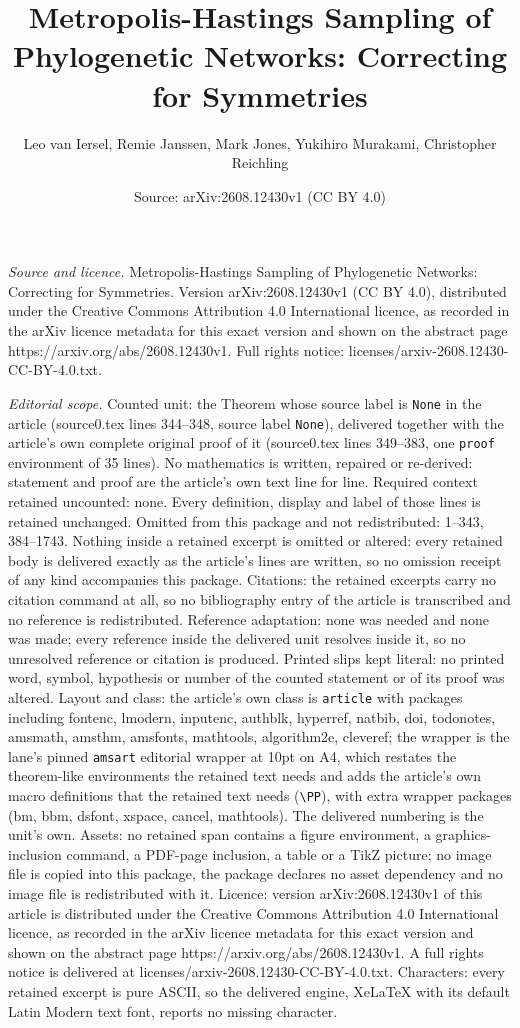 \documentclass[10pt,a4paper]{amsart}
\title[Metropolis-Hastings Sampling of Phylogenetic Networks: Corre]{Metropolis-Hastings Sampling of Phylogenetic Networks: Correcting for Symmetries}
\author{Leo van Iersel, Remie Janssen, Mark Jones, Yukihiro Murakami, Christopher Reichling}
\date{Source: arXiv:2608.12430v1 (CC BY 4.0)}
\begin{document}
\maketitle

\noindent\emph{Source and licence.} Metropolis-Hastings Sampling of Phylogenetic Networks: Correcting for Symmetries. Version arXiv:2608.12430v1 (CC BY 4.0), distributed under the Creative Commons Attribution 4.0 International licence, as recorded in the arXiv licence metadata for this exact version and shown on the abstract page https://arxiv.org/abs/2608.12430v1. Full rights notice: licenses/arxiv-2608.12430-CC-BY-4.0.txt.\par\smallskip

\noindent\textit{Editorial scope.} Counted unit: the Theorem whose source label is \texttt{None} in the article (source0.tex lines 344--348, source label \texttt{None}), delivered together with the article's own complete original proof of it (source0.tex lines 349--383, one \texttt{proof} environment of 35 lines). No mathematics is written, repaired or re-derived: statement and proof are the article's own text line for line. Required context retained uncounted: none. Every definition, display and label of those lines is retained unchanged. Omitted from this package and not redistributed: 1--343, 384--1743. Nothing inside a retained excerpt is omitted or altered: every retained body is delivered exactly as the article's lines are written, so no omission receipt of any kind accompanies this package. Citations: the retained excerpts carry no citation command at all, so no bibliography entry of the article is transcribed and no reference is redistributed. Reference adaptation: none was needed and none was made; every reference inside the delivered unit resolves inside it, so no unresolved reference or citation is produced. Printed slips kept literal: no printed word, symbol, hypothesis or number of the counted statement or of its proof was altered. Layout and class: the article's own class is \texttt{article} with packages including fontenc, lmodern, inputenc, authblk, hyperref, natbib, doi, todonotes, amsmath, amsthm, amsfonts, mathtools, algorithm2e, cleveref; the wrapper is the lane's pinned \texttt{amsart} editorial wrapper at 10pt on A4, which restates the theorem-like environments the retained text needs and adds the article's own macro definitions that the retained text needs (\texttt{\textbackslash PP}), with extra wrapper packages (bm, bbm, dsfont, xspace, cancel, mathtools). The delivered numbering is the unit's own. Assets: no retained span contains a figure environment, a graphics-inclusion command, a PDF-page inclusion, a table or a TikZ picture; no image file is copied into this package, the package declares no asset dependency and no image file is redistributed with it. Licence: version arXiv:2608.12430v1 of this article is distributed under the Creative Commons Attribution 4.0 International licence, as recorded in the arXiv licence metadata for this exact version and shown on the abstract page https://arxiv.org/abs/2608.12430v1. A full rights notice is delivered at licenses/arxiv-2608.12430-CC-BY-4.0.txt. Characters: every retained excerpt is pure ASCII, so the delivered engine, XeLaTeX with its default Latin Modern text font, reports no missing character.
\end{document}
